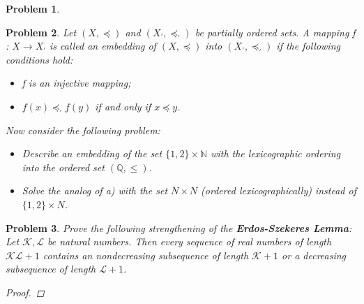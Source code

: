 \documentclass[12pt,a4paper]{article}
\makeatletter
\newtheorem{problem}{Problem}
\newtheorem*{solution}{Solution}
\theoremstyle{definition}
\renewenvironment{solution}[1][Solution] {\par\pushQED{\qed}\normalfont\topsep6\p@\@plus6\p@\relax\trivlist\item[\hskip\labelsep\bfseries#1\@addpunct{.}]\ignorespaces}{\popQED\endtrivlist\@endpefalse} \makeatother
\makeatother
\begin{document}
\begin{enumerate}
\begin{problem}
\begin{solution}
\end{solution}
\end{problem}
\par
\begin{problem}
Let $(X, \preccurlyeq)$ and $(X_{'}, \preccurlyeq_{'})$ be partially ordered sets. A mapping f : $X \rightarrow X_{'}$ is called an embedding of $(X, \preccurlyeq)$ into $(X_{'}, \preccurlyeq_{'})$ if the following conditions hold:\item
\begin{itemize}
\item f is an injective mapping;
\item $f(x)\preccurlyeq_{'} f(y)$ if and only if $x \preccurlyeq y$.
\end{itemize}
Now consider the following problem:
\begin{itemize}
\item [a)]Describe an embedding of the set $\{1, 2\} \times \mathbb{N}$ with the lexicographic ordering into the ordered set $(\mathbb{Q}, \leq)$.
\item [b)]Solve the analog of a) with the set $N \times N$ (ordered lexicographically) instead of $\{1, 2\} \times N$.
\end{itemize}
\begin{solution}\item
\renewcommand{\qedsymbol}{}

\end{solution}
\end{problem}
\par
\begin{problem}
Prove the following strengthening of the \textbf{Erdos-Szekeres Lemma}: Let $\mathscr{K}, \mathscr{L}$ be natural numbers. Then every sequence of real numbers of length $\mathscr{K} \mathscr{L} + 1$ contains an nondecreasing subsequence of length $\mathscr{K} + 1$ or a decreasing subsequence of length $\mathscr{L} + 1$.
\begin{proof}\item 
\renewcommand{\qedsymbol}{}

\end{proof}
\end{problem}


\end{enumerate}

\vspace{20pt}


\end{document}

